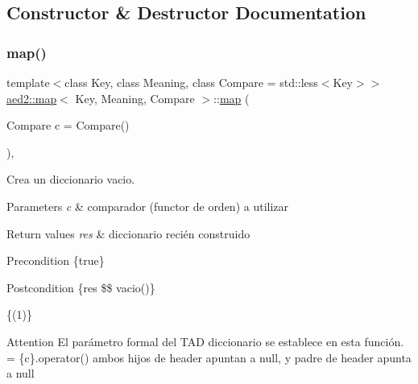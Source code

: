 \subsection{Constructor \& Destructor Documentation}
\mbox{\label{classaed2_1_1map_a64da1d965b13eb28cdb3837bc17a18cf}} 
\subsubsection{\texorpdfstring{map()}{map()}\hspace{0.1cm}{\footnotesize\ttfamily [1/6]}}
{\footnotesize\ttfamily template$<$class Key, class Meaning, class Compare = std\+::less$<$\+Key$>$$>$ \\
\hyperlink{classaed2_1_1map}{aed2\+::map}$<$ Key, Meaning, Compare $>$\+::\hyperlink{classaed2_1_1map}{map} (\begin{DoxyParamCaption}\item[{Compare}]{c = {\ttfamily Compare()} }\end{DoxyParamCaption})\hspace{0.3cm}{\ttfamily [inline]}, {\ttfamily [explicit]}}



Crea un diccionario vacio. 


\begin{DoxyParams}{Parameters}
{\em c} & comparador (functor de orden) a utilizar \\
\hline
\end{DoxyParams}

\begin{DoxyRetVals}{Return values}
{\em res} & diccionario recién construido\\
\hline
\end{DoxyRetVals}
\begin{DoxyPrecond}{Precondition}
\{true\} 
\end{DoxyPrecond}
\begin{DoxyPostcond}{Postcondition}
\{res \$\$ vacio()\}
\end{DoxyPostcond}
\{(1)\}

\begin{DoxyAttention}{Attention}
El parámetro formal  del T\+AD diccionario se establece en esta función.  = \{c\}.operator() ambos hijos de header apuntan a null, y padre de header apunta a null 
\end{DoxyAttention}
\mbox{\label{classaed2_1_1map_a7a77950a3d8e637bfa7cf5dcd904f257}} 
